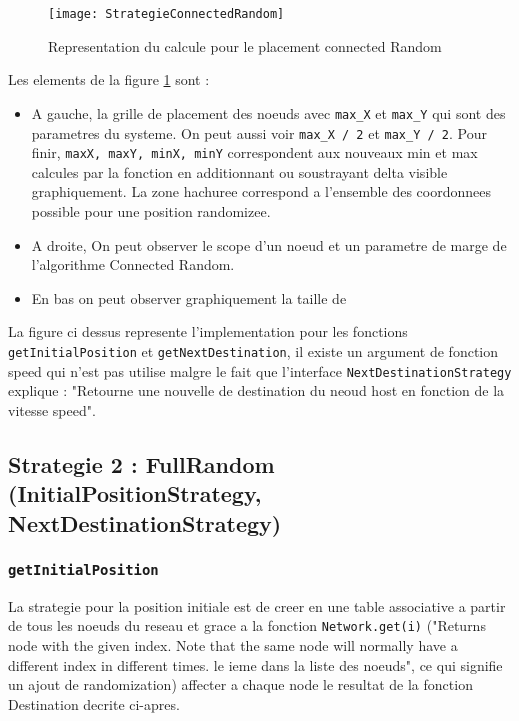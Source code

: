 \documentclass[11pt,a4paper,sans]{report}
\begin{document}
	\begin{figure}[H]
		\centering
		\texttt{[image: StrategieConnectedRandom]}
		\caption{Representation du calcule pour le placement connected Random}
		\label{fig:mesh1}
	\end{figure}


	\par Les elements de la figure \ref{fig:mesh1} sont :
	\begin{itemize}
		\item A gauche, la grille de placement des noeuds avec \texttt{max\_X} et \texttt{max\_Y} qui sont des parametres du systeme. On peut aussi voir \texttt{max\_X / 2} et \texttt{max\_Y / 2}. Pour finir, \texttt{maxX, maxY, minX, minY} correspondent aux nouveaux min et max calcules par la fonction en additionnant ou soustrayant delta visible graphiquement. La zone hachuree correspond a l'ensemble des coordonnees possible pour une position randomizee.
		\item A droite, On peut observer le scope d'un noeud et un parametre de marge de l'algorithme Connected Random.
		\item En bas on peut observer graphiquement la taille de 
	\end{itemize}

	La figure ci dessus\pageref{fig:mesh1} represente l'implementation pour les fonctions \texttt{getInitialPosition} et \texttt{getNextDestination}, il existe un argument de fonction speed qui n'est pas utilise malgre le fait que l'interface \texttt{NextDestinationStrategy} explique : "Retourne une nouvelle de destination du neoud host en fonction de la vitesse speed".

	\newpage
	\subsection*{Strategie 2 : FullRandom (InitialPositionStrategy, NextDestinationStrategy)}

	\subsubsection{\texttt{getInitialPosition}}
	\par La strategie pour la position initiale est de creer en une table associative a partir de tous les noeuds du reseau et grace a la fonction \texttt{Network.get(i)} ("Returns node with the given index. Note that the same node will normally have a different index in different times. le ieme dans la liste des noeuds", ce qui signifie un ajout de randomization) affecter a chaque node le resultat de la fonction Destination decrite ci-apres.
\end{document}
